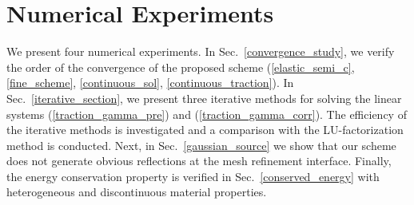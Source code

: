 \section{Numerical Experiments}
We present four numerical experiments. 
 In Sec.~\ref{convergence_study}, we verify the order of the convergence of the proposed scheme (\ref{elastic_semi_c}, \ref{fine_scheme}, \ref{continuous_sol}, \ref{continuous_traction}).  In  Sec.~\ref{iterative_section}, we present three iterative methods for solving the linear systems (\ref{traction_gamma_pre}) and (\ref{traction_gamma_corr}). The efficiency of the iterative methods is investigated and a comparison with the LU-factorization method is conducted. Next, in Sec.~\ref{gaussian_source} we show that our scheme does not generate obvious reflections at the mesh refinement interface. Finally, the energy conservation property is verified in Sec.~\ref{conserved_energy} with heterogeneous and discontinuous material properties.